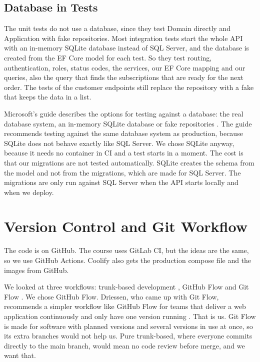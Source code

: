 \documentclass[a4paper,11pt]{article}
\begin{document}
\subsection{Database in Tests}
The unit tests do not use a database, since they test Domain directly and Application with fake repositories. Most integration tests start the whole API with an in-memory SQLite database instead of SQL Server, and the database is created from the EF Core model for each test. So they test routing, authentication, roles, status codes, the services, our EF Core mapping and our queries, also the query that finds the subscriptions that are ready for the next order. The tests of the customer endpoints still replace the repository with a fake that keeps the data in a list.

Microsoft's guide describes the options for testing against a database: the real database system, an in-memory SQLite database or fake repositories \cite{microsoft-efcore-testing-strategy}. The guide recommends testing against the same database system as production, because SQLite does not behave exactly like SQL Server. We chose SQLite anyway, because it needs no container in CI and a test starts in a moment. The cost is that our migrations are not tested automatically. SQLite creates the schema from the model and not from the migrations, which are made for SQL Server. The migrations are only run against SQL Server when the API starts locally and when we deploy.

\section{Version Control and Git Workflow}
\label{sec:git}
The code is on GitHub. The course uses GitLab CI, but the ideas are the same, so we use GitHub Actions. Coolify also gets the production compose file and the images from GitHub.

We looked at three workflows: trunk-based development \cite{hammant-trunk-based-development}, GitHub Flow \cite{chacon-github-flow-2011} and Git Flow \cite{driessen-git-branching-model}. We chose GitHub Flow. Driessen, who came up with Git Flow, recommends a simpler workflow like GitHub Flow for teams that deliver a web application continuously and only have one version running \cite{driessen-git-branching-model}. That is us. Git Flow is made for software with planned versions and several versions in use at once, so its extra branches would not help us. Pure trunk-based, where everyone commits directly to the main branch, would mean no code review before merge, and we want that.
\end{document}
